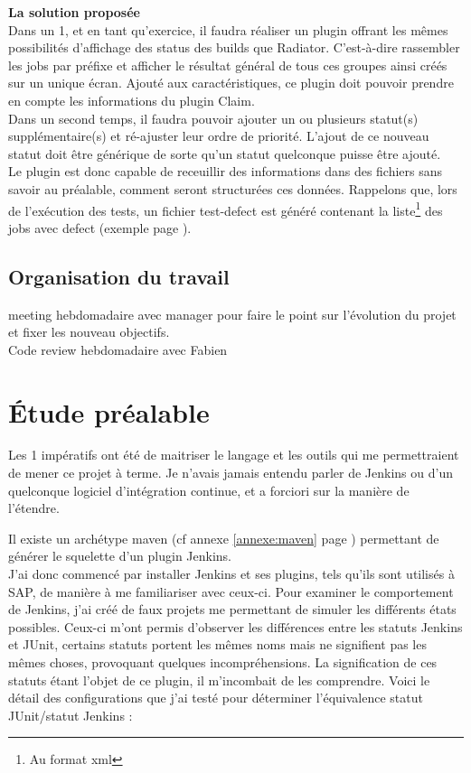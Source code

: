 \textbf{La solution propos\'{e}e}\hfill \\ \indent
Dans un 1, et en tant qu'exercice, il faudra réaliser un plugin offrant les mêmes possibilités d'affichage des status des builds que Radiator. C'est-à-dire rassembler les jobs par préfixe et afficher le résultat général de tous ces groupes ainsi créés sur un unique écran. Ajouté aux caractéristiques, ce plugin doit pouvoir prendre en compte les informations du plugin Claim.\\ \indent
Dans un second temps, il faudra pouvoir ajouter un ou plusieurs statut(s) supplémentaire(s) et ré-ajuster leur ordre de priorité. L'ajout de ce nouveau statut doit être générique de sorte qu'un statut quelconque puisse être ajouté.\\
Le plugin est donc capable de receuillir des informations dans des fichiers sans savoir au préalable, comment seront structurées ces données. Rappelons que, lors de l'exécution des tests, un fichier test-defect est généré contenant la liste\footnote{Au format xml} des jobs avec defect (exemple page \pageref{testdefectxml}).





\subsection{Organisation du travail}
meeting hebdomadaire avec manager pour faire le point sur l'évolution du projet et fixer les nouveau objectifs.\\
Code review hebdomadaire avec Fabien


\section{\'{E}tude préalable}
Les 1 impératifs ont été de maitriser le langage et les outils qui me permettraient de mener ce projet à terme. Je n'avais jamais entendu parler de Jenkins ou d'un quelconque logiciel d'intégration continue, et a forciori sur la manière de l'étendre. 


Il existe un archétype maven (cf annexe \ref{annexe:maven} page \pageref{annexe:maven}) permettant de générer le squelette d'un plugin Jenkins.\\

J'ai donc commencé par installer Jenkins et ses plugins, tels qu'ils sont utilisés à SAP, de manière à me familiariser avec ceux-ci. Pour examiner le comportement de Jenkins, j'ai créé de faux projets me permettant de simuler les différents états possibles. Ceux-ci m'ont permis d'observer les différences entre les statuts Jenkins et JUnit, certains statuts portent les mêmes noms mais ne signifient pas les mêmes choses, provoquant quelques incompréhensions. La signification de ces statuts étant l'objet de ce plugin, il m'incombait de les comprendre. Voici le détail des configurations que j'ai testé pour déterminer l'équivalence statut JUnit/statut Jenkins :

